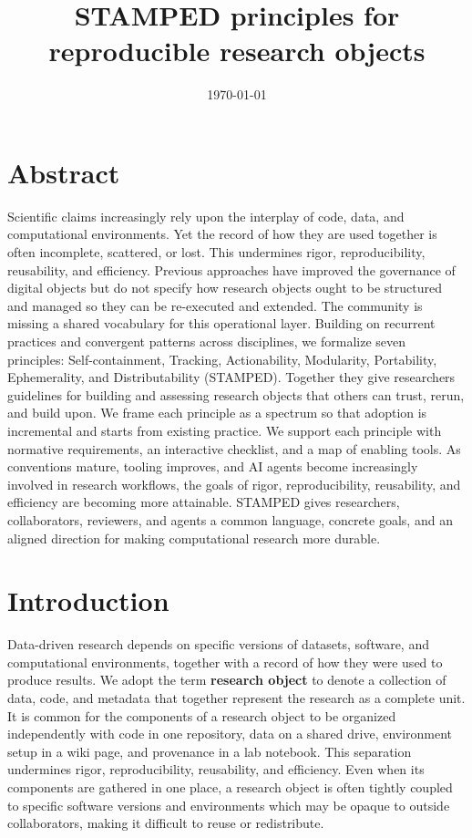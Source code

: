 \documentclass{article}
\title{STAMPED principles for reproducible research objects}
\date{\monthyeardate\today}
\makeatletter
\newcommand{\hyanchor}[1]{\texorpdfstring{\Hy@raisedlink{\hypertarget{#1}{}}}{}}
\newcommand{\anchoredsection}[2]{\section[#2]{\hyanchor{#1}#2}}
\makeatother
\begin{document}
\maketitle

\anchoredsection{abstract}{Abstract}

Scientific claims increasingly rely upon the interplay of code, data, and computational environments.
Yet the record of how they are used together is often incomplete, scattered, or lost.
This undermines rigor, reproducibility, reusability, and efficiency.
Previous approaches have improved the governance of digital objects but do not specify how research objects ought to be structured and managed so they can be re-executed and extended.
The community is missing a shared vocabulary for this operational layer.
Building on recurrent practices and convergent patterns across disciplines, we formalize seven principles: Self-containment, Tracking, Actionability, Modularity, Portability, Ephemerality, and Distributability (STAMPED).
Together they give researchers guidelines for building and assessing research objects that others can trust, rerun, and build upon.
We frame each principle as a spectrum so that adoption is incremental and starts from existing practice.
We support each principle with normative requirements, an interactive checklist, and a map of enabling tools.
As conventions mature, tooling improves, and AI agents become increasingly involved in research workflows, the goals of rigor, reproducibility, reusability, and efficiency are becoming more attainable.
STAMPED gives researchers, collaborators, reviewers, and agents a common language, concrete goals, and an aligned direction for making computational research more durable.

\anchoredsection{introduction}{Introduction}

Data-driven research depends on specific versions of datasets, software, and computational environments, together with a record of how they were used to produce results.
We adopt the term \textbf{research object}\cite{bechhofer_why_2013,peroni_packaging_2022} to denote a collection of data, code, and metadata that together represent the research as a complete unit.
It is common for the components of a research object to be organized independently with code in one repository, data on a shared drive, environment setup in a wiki page, and provenance in a lab notebook.
This separation undermines rigor, reproducibility, reusability, and efficiency.
Even when its components are gathered in one place, a research object is often tightly coupled to specific software versions and environments which may be opaque to outside collaborators, making it difficult to reuse or redistribute.
\end{document}
